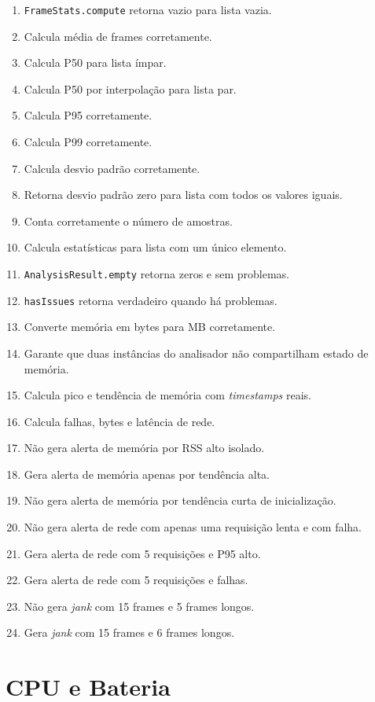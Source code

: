 \begin{enumerate}
  \item \texttt{FrameStats.compute} retorna vazio para lista vazia.
  \item Calcula média de frames corretamente.
  \item Calcula P50 para lista ímpar.
  \item Calcula P50 por interpolação para lista par.
  \item Calcula P95 corretamente.
  \item Calcula P99 corretamente.
  \item Calcula desvio padrão corretamente.
  \item Retorna desvio padrão zero para lista com todos os valores iguais.
  \item Conta corretamente o número de amostras.
  \item Calcula estatísticas para lista com um único elemento.
  \item \texttt{AnalysisResult.empty} retorna zeros e sem problemas.
  \item \texttt{hasIssues} retorna verdadeiro quando há problemas.
  \item Converte memória em bytes para MB corretamente.
  \item Garante que duas instâncias do analisador não compartilham estado de memória.
  \item Calcula pico e tendência de memória com \textit{timestamps} reais.
  \item Calcula falhas, bytes e latência de rede.
  \item Não gera alerta de memória por RSS alto isolado.
  \item Gera alerta de memória apenas por tendência alta.
  \item Não gera alerta de memória por tendência curta de inicialização.
  \item Não gera alerta de rede com apenas uma requisição lenta e com falha.
  \item Gera alerta de rede com 5 requisições e P95 alto.
  \item Gera alerta de rede com 5 requisições e falhas.
  \item Não gera \textit{jank} com 15 frames e 5 frames longos.
  \item Gera \textit{jank} com 15 frames e 6 frames longos.
\end{enumerate}

\section{CPU e Bateria}

